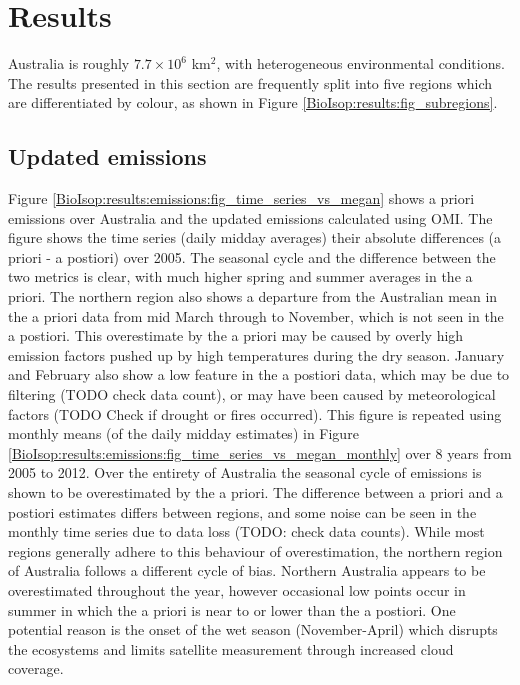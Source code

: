 \section{Results}
  \label{BioIsop:results}
  
  Australia is roughly $7.7 \times 10^6$ km$^{2}$, with heterogeneous environmental conditions.
  The results presented in this section are frequently split into five regions which are differentiated by colour, as shown in Figure \ref{BioIsop:results:fig_subregions}.
  
  

  \subsection{Updated emissions}
    \label{BioIsop:results:emissions}
    
    Figure \ref{BioIsop:results:emissions:fig_time_series_vs_megan} shows a priori emissions over Australia and the updated emissions calculated using OMI.
    The figure shows the time series (daily midday averages) their absolute differences (a priori - a postiori) over 2005.
    The seasonal cycle and the difference between the two metrics is clear, with much higher spring and summer averages in the a priori.
    The northern region also shows a departure from the Australian mean in the a priori data from mid March through to November, which is not seen in the a postiori.
    This overestimate by the a priori may be caused by overly high emission factors pushed up by high temperatures during the dry season.
    January and February also show a low feature in the a postiori data, which may be due to filtering (TODO check data count), or may have been caused by meteorological factors (TODO Check if drought or fires occurred).
    This figure is repeated using monthly means (of the daily midday estimates) in Figure \ref{BioIsop:results:emissions:fig_time_series_vs_megan_monthly} over 8 years from 2005 to 2012.
    Over the entirety of Australia the seasonal cycle of emissions is shown to be overestimated by the a priori.
    The difference between a priori and a postiori estimates differs between regions, and some noise can be seen in the monthly time series due to data loss (TODO: check data counts).
    While most regions generally adhere to this behaviour of overestimation, the northern region of Australia follows a different cycle of bias.
    Northern Australia appears to be overestimated throughout the year, however occasional low points occur in summer in which the a priori is near to or lower than the a postiori.
    One potential reason is the onset of the wet season (November-April) which disrupts the ecosystems and limits satellite measurement through increased cloud coverage.
    
